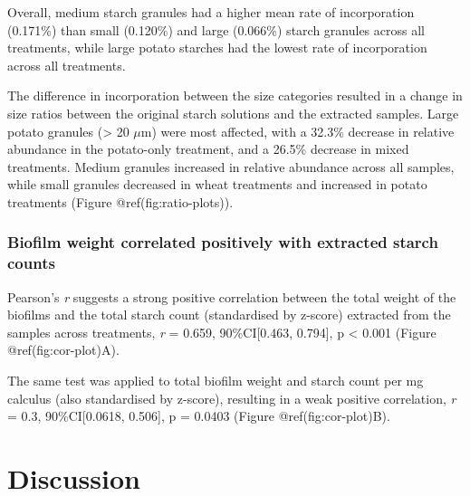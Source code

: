 \documentclass[
  letterpaper,
]{book}
\begin{document}
Overall, medium starch granules had a higher mean rate of incorporation
(0.171\%) than small (0.120\%) and large (0.066\%) starch granules
across all treatments, while large potato starches had the lowest rate
of incorporation across all treatments.

The difference in incorporation between the size categories resulted in
a change in size ratios between the original starch solutions and the
extracted samples. Large potato granules (\textgreater{} 20 \(\mu\)m)
were most affected, with a 32.3\% decrease in relative abundance in the
potato-only treatment, and a 26.5\% decrease in mixed treatments. Medium
granules increased in relative abundance across all samples, while small
granules decreased in wheat treatments and increased in potato
treatments (Figure @ref(fig:ratio-plots)).

\hypertarget{biofilm-weight-correlated-positively-with-extracted-starch-counts}{%
\subsection{Biofilm weight correlated positively with extracted starch
counts}\label{biofilm-weight-correlated-positively-with-extracted-starch-counts}}

Pearson's \emph{r} suggests a strong positive correlation between the
total weight of the biofilms and the total starch count (standardised by
z-score) extracted from the samples across treatments, \emph{r} = 0.659,
90\%CI{[}0.463, 0.794{]}, p \textless{} 0.001 (Figure
@ref(fig:cor-plot)A).

The same test was applied to total biofilm weight and starch count per
mg calculus (also standardised by z-score), resulting in a weak positive
correlation, \emph{r} = 0.3, 90\%CI{[}0.0618, 0.506{]}, p = 0.0403
(Figure @ref(fig:cor-plot)B).


\hypertarget{discussion}{%
\chapter{Discussion}\label{discussion}}
\end{document}
